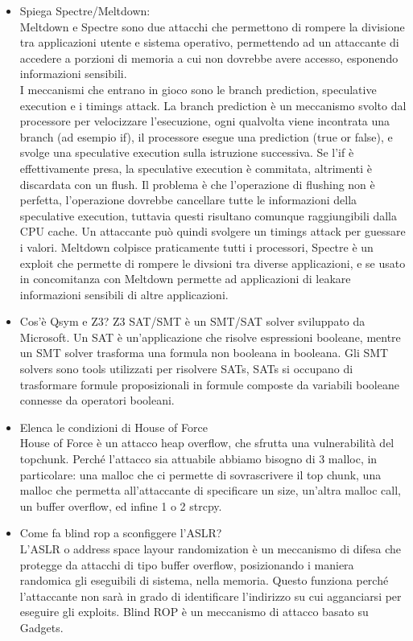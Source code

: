 \documentclass[11pt, oneside]{article}   	%
\begin{document}
\begin{itemize}
\item Spiega Spectre/Meltdown:\\
Meltdown e Spectre sono due attacchi che permettono di rompere la divisione tra applicazioni utente e sistema operativo, permettendo ad un attaccante di accedere a porzioni di memoria a cui non dovrebbe avere accesso, esponendo informazioni sensibili.\\
I meccanismi che entrano in gioco sono le branch prediction, speculative execution e i timings attack. La branch prediction è un meccanismo svolto dal processore per velocizzare l'esecuzione, ogni qualvolta viene incontrata una branch (ad esempio if), il processore esegue una prediction (true or false), e svolge una speculative execution sulla istruzione successiva. Se l'if è effettivamente presa, la speculative execution è commitata, altrimenti è discardata con un flush. 
Il problema è che l'operazione di flushing non è perfetta, l'operazione dovrebbe cancellare tutte le informazioni della speculative execution, tuttavia questi risultano comunque raggiungibili dalla CPU cache. Un attaccante può quindi svolgere un timings attack per guessare i valori.
Meltdown colpisce praticamente tutti i processori, Spectre è un exploit che permette di rompere le divsioni tra diverse applicazioni, e se usato in concomitanza con Meltdown permette ad applicazioni di leakare informazioni sensibili di altre applicazioni.
\item Cos'è Qsym e Z3?
Z3 SAT/SMT è un SMT/SAT solver sviluppato da Microsoft. Un SAT è un'applicazione che risolve espressioni booleane, mentre un SMT solver trasforma una formula non booleana in booleana. 
Gli SMT solvers sono tools utilizzati per risolvere SATs, SATs si occupano di trasformare formule proposizionali in formule composte da variabili booleane connesse da operatori booleani.
\item Elenca le condizioni di House of Force\\
House of Force è un attacco heap overflow, che sfrutta una vulnerabilità del topchunk. Perché l'attacco sia attuabile abbiamo bisogno di 3 malloc, in particolare: una malloc che ci permette di sovrascrivere il top chunk, una malloc che permetta all'attaccante di specificare un size, un'altra malloc call, un buffer overflow, ed infine 1 o 2 strcpy.
\item Come fa blind rop a sconfiggere l'ASLR?\\
L'ASLR o address space layour randomization è un meccanismo di difesa che protegge da attacchi di tipo buffer overflow, posizionando i maniera randomica gli eseguibili di sistema, nella memoria. Questo funziona perché l'attaccante non sarà in grado di identificare l'indirizzo su cui agganciarsi per eseguire gli exploits. Blind ROP è un meccanismo di attacco basato su Gadgets.

\end{itemize}
\end{document}
